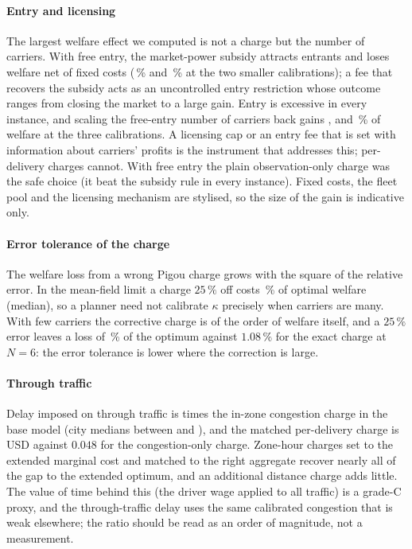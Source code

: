 \documentclass[preprint,11pt,authoryear]{elsarticle}
\theoremstyle{plain}
\theoremstyle{remark}
\begin{document}
\paragraph{Entry and licensing} The largest welfare effect we computed is not a charge but the number of carriers. With free entry, the market-power subsidy attracts entrants and loses welfare net of fixed costs (\EntSixPmdSW\,\% and \EntTwentyFourPmdSW\,\% at the two smaller calibrations); a fee that recovers the subsidy acts as an uncontrolled entry restriction whose outcome ranges from closing the market to a large gain. Entry is excessive in every instance, and scaling the free-entry number of carriers back gains \EntSixMwGain, \EntTwentyFourMwGain{} and \EntOneNinetyTwoMwGain\,\% of welfare at the three calibrations. A licensing cap or an entry fee that is set with information about carriers' profits is the instrument that addresses this; per-delivery charges cannot. With free entry the plain observation-only charge was the safe choice (it beat the subsidy rule in every instance). Fixed costs, the fleet pool and the licensing mechanism are stylised, so the size of the gain is indicative only.

\paragraph{Error tolerance of the charge} The welfare loss from a wrong Pigou charge grows with the square of the relative error. In the mean-field limit a charge $25\,\%$ off costs \MisTwentyFiveLoss\,\% of optimal welfare (median), so a planner need not calibrate $\kappa$ precisely when carriers are many. With few carriers the corrective charge is of the order of welfare itself, and a $25\,\%$ error leaves a loss of \MisNSixTwentyFive\,\% of the optimum against $1.08\,\%$ for the exact charge at $N=6$: the error tolerance is lower where the correction is large.

\paragraph{Through traffic} Delay imposed on through traffic is \ExtRatioKQ{} times the in-zone congestion charge in the base model (city medians between \ExtRatioKQMin{} and \ExtRatioKQMax), and the matched per-delivery charge is \ExtChargeMatch{} USD against $0.048$ for the congestion-only charge. Zone-hour charges set to the extended marginal cost and matched to the right aggregate recover nearly all of the gap to the extended optimum, and an additional distance charge adds little. The value of time behind this (the driver wage applied to all traffic) is a grade-C proxy, and the through-traffic delay uses the same calibrated congestion that is weak elsewhere; the ratio should be read as an order of magnitude, not a measurement.
\end{document}
